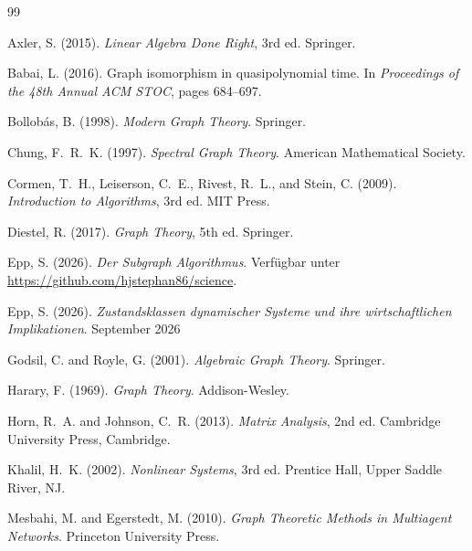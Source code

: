 \documentclass[12pt, a4paper]{article}
\theoremstyle{definition}
\theoremstyle{remark}
\begin{document}

\begin{thebibliography}{99}

Axler, S. (2015).
\newblock \textit{Linear Algebra Done Right}, 3rd ed.
\newblock Springer.

Babai, L. (2016).
\newblock Graph isomorphism in quasipolynomial time.
\newblock In \textit{Proceedings of the 48th Annual ACM STOC}, pages 684--697.

Bollobás, B. (1998).
\newblock \textit{Modern Graph Theory}.
\newblock Springer.

Chung, F.~R.~K. (1997).
\newblock \textit{Spectral Graph Theory}.
\newblock American Mathematical Society.

Cormen, T.~H., Leiserson, C.~E., Rivest, R.~L., and Stein, C. (2009).
\newblock \textit{Introduction to Algorithms}, 3rd ed.
\newblock MIT Press.

Diestel, R. (2017).
\newblock \textit{Graph Theory}, 5th ed.
\newblock Springer.

Epp, S. (2026).
\newblock \textit{Der Subgraph Algorithmus}. Verfügbar unter
\url{https://github.com/hjstephan86/science}.

Epp, S. (2026).
\newblock \textit{Zustandsklassen dynamischer Systeme und ihre wirtschaftlichen
	Implikationen}. September 2026

Godsil, C. and Royle, G. (2001).
\newblock \textit{Algebraic Graph Theory}.
\newblock Springer.

Harary, F. (1969).
\newblock \textit{Graph Theory}.
\newblock Addison-Wesley.

Horn, R.~A. and Johnson, C.~R. (2013).
\newblock \textit{Matrix Analysis}, 2nd ed.
\newblock Cambridge University Press, Cambridge.

Khalil, H.~K. (2002).
\newblock \textit{Nonlinear Systems}, 3rd ed.
\newblock Prentice Hall, Upper Saddle River, NJ.

Mesbahi, M. and Egerstedt, M. (2010).
\newblock \textit{Graph Theoretic Methods in Multiagent Networks}.
\newblock Princeton University Press.


\end{thebibliography}
\end{document}
